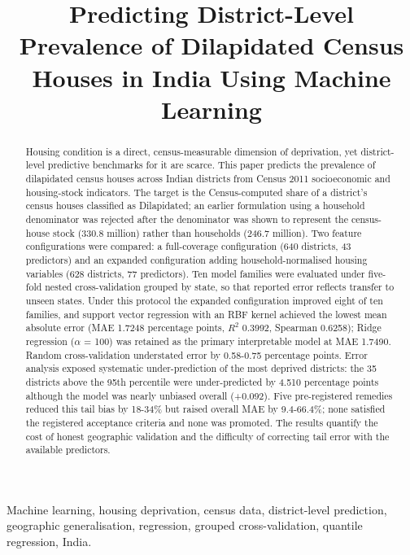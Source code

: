 \documentclass[conference]{IEEEtran}
\begin{document}
\title{Predicting District-Level Prevalence of Dilapidated Census Houses in India Using Machine Learning}
\author{
}
\maketitle

\begin{abstract}
Housing condition is a direct, census-measurable dimension of deprivation, yet district-level predictive benchmarks for it are scarce. This paper predicts the prevalence of dilapidated census houses across Indian districts from Census 2011 socioeconomic and housing-stock indicators. The target is the Census-computed share of a district's census houses classified as Dilapidated; an earlier formulation using a household denominator was rejected after the denominator was shown to represent the census-house stock (330.8 million) rather than households (246.7 million). Two feature configurations were compared: a full-coverage configuration (640 districts, 43 predictors) and an expanded configuration adding household-normalised housing variables (628 districts, 77 predictors). Ten model families were evaluated under five-fold nested cross-validation grouped by state, so that reported error reflects transfer to unseen states. Under this protocol the expanded configuration improved eight of ten families, and support vector regression with an RBF kernel achieved the lowest mean absolute error (MAE 1.7248 percentage points, $R^2$ 0.3992, Spearman 0.6258); Ridge regression ($\alpha$ = 100) was retained as the primary interpretable model at MAE 1.7490. Random cross-validation understated error by 0.58-0.75 percentage points. Error analysis exposed systematic under-prediction of the most deprived districts: the 35 districts above the 95th percentile were under-predicted by 4.510 percentage points although the model was nearly unbiased overall (+0.092). Five pre-registered remedies reduced this tail bias by 18-34\% but raised overall MAE by 9.4-66.4\%; none satisfied the registered acceptance criteria and none was promoted. The results quantify the cost of honest geographic validation and the difficulty of correcting tail error with the available predictors.
\end{abstract}

\begin{IEEEkeywords}
Machine learning, housing deprivation, census data, district-level prediction, geographic generalisation, regression, grouped cross-validation, quantile regression, India.
\end{IEEEkeywords}
\end{document}
